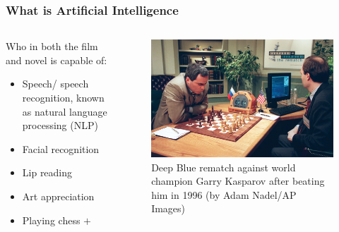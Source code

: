 \documentclass[aspectratio=169]{beamer}
\begin{document}
  \begin{frame}
    \frametitle{What is Artificial Intelligence}
    \begin{columns}
      \begin{column}{0.5\textwidth}
        Who in both the film and novel is capable of:
        \begin{itemize}
          \item Speech/ speech recognition, known as natural language processing (NLP)
          \item Facial recognition
          \item Lip reading
          \item Art appreciation
          \item Playing chess $+$
        \end{itemize}
      \end{column}
      \begin{column}{0.5\textwidth}
        \begin{figure}[th!]
          \centering
          \includegraphics[width=1\textwidth]{deep-blue.jpg}
          \caption{Deep Blue rematch against world champion Garry Kasparov after beating him in 1996 (by Adam Nadel/AP Images)}
          \label{fig:jim_carrey}
        \end{figure}
      \end{column}
    \end{columns}
  \end{frame}
\end{document}
